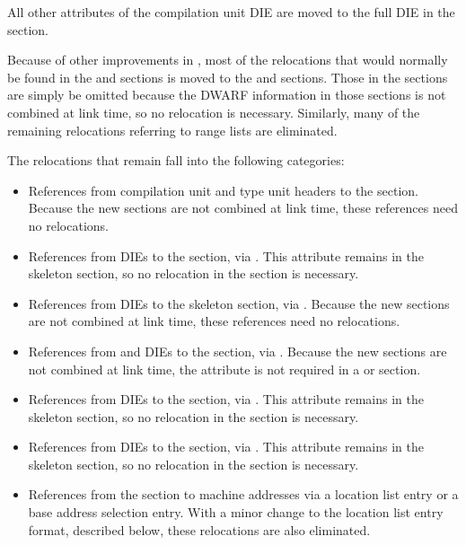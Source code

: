 All other attributes of the compilation unit DIE are moved to
the full DIE in the \dotdebuginfodwo{} section.

Because of other improvements in \DWARFVersionV, most of the
relocations that would normally be found in the \dotdebuginfodwo{}
and \dotdebugtypesdwo{} sections is moved to the \dotdebugaddr{} and
\dotdebugstroffsetsdwo{} sections. Those in the
\dotdebugstroffsetsdwo{} sections are simply be omitted because the
DWARF information in those sections is not combined at link
time, so no relocation is necessary. Similarly,
many of the remaining relocations referring to range lists are
eliminated. 

The relocations that remain fall into the following categories:
\begin{itemize}
\item
References from compilation unit and type unit headers to the
\dotdebugabbrevdwo{} section. Because the new sections are not
combined at link time, these references need no relocations.
\item
References from \DWTAGcompileunit{} DIEs to the
\dotdebuglinedwo{} section, via \DWATstmtlist{}. This attribute
remains in the skeleton \dotdebuginfo{} section, so no
relocation in the \dotdebuginfodwo{} section is necessary.
\item
References from \DWTAGtypeunit{} DIEs to the skeleton
\dotdebuglinedwo{} section, via \DWATstmtlist{}. Because the new
sections are not combined at link time, these references need
no relocations.
\item
References from \DWTAGcompileunit{} and \DWTAGtypeunit{} DIEs
to the \dotdebugstroffsetsdwo{} section, via
\DWATstroffsetsbase{}. Because the new sections are not
combined at link time, the \DWATstroffsetsbase{} attribute
is not required in a \dotdebuginfodwo{} or \dotdebugtypesdwo{}
section.
\item
References from \DWTAGcompileunit{} DIEs to the \dotdebugaddr{}
section, via \DWATaddrbase{}. This attribute remains in
the skeleton \dotdebuginfo{} section, so no relocation in the
\dotdebuginfodwo{} section is necessary.
\item
References from \DWTAGcompileunit{} DIEs to the \dotdebugranges{}
section, via \DWATrangesbase{}. This attribute remains in
the skeleton \dotdebuginfo{} section, so no relocation in the
\dotdebuginfodwo{} section is necessary.
\item
References from the \dotdebuglocdwo{} section to machine addresses
via a location list entry or a base address selection entry.
With a minor change to the location list entry format,
described below, these relocations are also eliminated.
\end{itemize}


